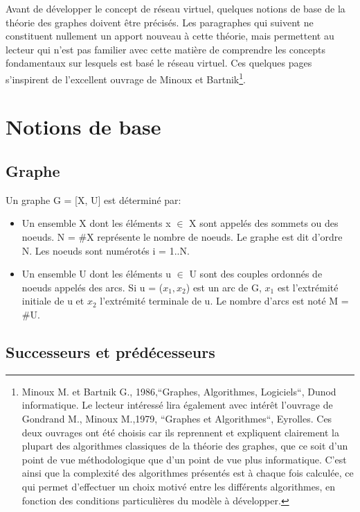 Avant de développer le concept de réseau virtuel, quelques notions de base de la
théorie des graphes doivent être précisés. Les paragraphes qui suivent ne
constituent nullement un apport nouveau à cette théorie, mais permettent au
lecteur qui n'est pas familier avec cette matière de comprendre les concepts
fondamentaux sur lesquels est basé le réseau virtuel. Ces quelques pages
s'ins\-pirent de l'excellent ouvrage de Minoux et Bartnik\footnote{Minoux M. et
Bartnik G., 1986,``Graphes, Algorithmes, Logiciels``, Dunod informatique. Le
lecteur intéressé lira également avec intérêt l'ouvrage de Gondrand M., Minoux
M.,1979, ``Graphes et Algorithmes``, Eyrolles. Ces deux ouvrages ont été choisis
car ils reprennent et expliquent clairement la plupart des algorithmes
classiques de la théorie des graphes, que ce soit d'un point de vue
méthodologique que d'un point de vue plus informatique. C'est ainsi que la
complexité des algorithmes présentés est à chaque fois calculée, ce qui permet
d'effectuer un choix motivé entre les différents algorithmes, en fonction des
conditions particulières du modèle à développer.}.

\section{Notions de base}

\subsection{Graphe}

Un graphe G = [X, U] est déterminé par:

\begin{itemize}
\item Un ensemble X dont les éléments x $\in$ X sont appelés des sommets ou
des noeuds. N = \#X représente le nombre de noeuds. Le graphe est
dit d'ordre N. Les noeuds sont numérotés i = 1..N.
\item Un ensemble U dont les éléments u $\in$ U sont des couples ordonnés de
noeuds appelés des arcs. Si u = ($x_1,x_2$) est un arc de G, $x_1$
est l'extrémité initiale de u et $x_2$ l'extrémité terminale de u.
Le nombre d'arcs est noté M = \#U.
\end{itemize}

\subsection{Successeurs et pr\'ed\'ecesseurs}

